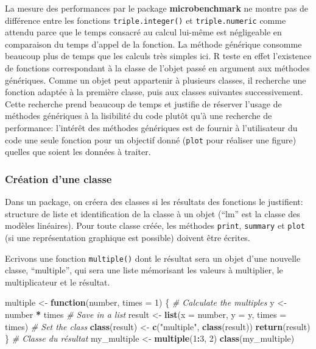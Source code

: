 \documentclass[
  12pt,
  french,
  a4paper,
  extrafontsizes,onecolumn,openright
  ]{memoir}
\newenvironment{Shaded}{\begin{snugshade}}{\end{snugshade}}
\newcommand{\AttributeTok}[1]{\textcolor[rgb]{0.13,0.29,0.53}{#1}}
\newcommand{\CommentTok}[1]{\textcolor[rgb]{0.56,0.35,0.01}{\textit{#1}}}
\newcommand{\ControlFlowTok}[1]{\textcolor[rgb]{0.13,0.29,0.53}{\textbf{#1}}}
\newcommand{\DecValTok}[1]{\textcolor[rgb]{0.00,0.00,0.81}{#1}}
\newcommand{\FunctionTok}[1]{\textcolor[rgb]{0.13,0.29,0.53}{\textbf{#1}}}
\newcommand{\NormalTok}[1]{#1}
\newcommand{\OtherTok}[1]{\textcolor[rgb]{0.56,0.35,0.01}{#1}}
\newcommand{\SpecialCharTok}[1]{\textcolor[rgb]{0.81,0.36,0.00}{\textbf{#1}}}
\newcommand{\StringTok}[1]{\textcolor[rgb]{0.31,0.60,0.02}{#1}}
\newlength{\rf}
\begin{document}
La mesure des performances par le package \textbf{microbenchmark} ne montre pas de différence entre les fonctions \texttt{triple.integer()} et \texttt{triple.numeric} comme attendu parce que le temps consacré au calcul lui-même est négligeable en comparaison du temps d'appel de la fonction.
La méthode générique consomme beaucoup plus de temps que les calculs très simples ici.
R teste en effet l'existence de fonctions correspondant à la classe de l'objet passé en argument aux méthodes génériques.
Comme un objet peut appartenir à plusieurs classes, il recherche une fonction adaptée à la première classe, puis aux classes suivantes successivement.
Cette recherche prend beaucoup de temps et justifie de réserver l'usage de méthodes génériques à la lisibilité du code plutôt qu'à une recherche de performance: l'intérêt des méthodes génériques est de fournir à l'utilisateur du code une seule fonction pour un objectif donné (\texttt{plot} pour réaliser une figure) quelles que soient les données à traiter.

\subsubsection{Création d'une classe}\label{cruxe9ation-dune-classe}

Dans un package, on créera des classes si les résultats des fonctions le justifient: structure de liste et identification de la classe à un objet (\enquote{lm} est la classe des modèles linéaires).
Pour toute classe créée, les méthodes \texttt{print}, \texttt{summary} et \texttt{plot} (si une représentation graphique est possible) doivent être écrites.

Ecrivons une fonction \texttt{multiple()} dont le résultat sera un objet d'une nouvelle classe, \enquote{multiple}, qui sera une liste mémorisant les valeurs à multiplier, le multiplicateur et le résultat.

\scriptsize

\begin{Shaded}
\begin{Highlighting}[]
\NormalTok{multiple }\OtherTok{\textless{}{-}} \ControlFlowTok{function}\NormalTok{(number, }\AttributeTok{times =} \DecValTok{1}\NormalTok{) \{}
  \CommentTok{\# Calculate the multiples}
\NormalTok{  y }\OtherTok{\textless{}{-}}\NormalTok{ number }\SpecialCharTok{*}\NormalTok{ times}
  \CommentTok{\# Save in a list}
\NormalTok{  result }\OtherTok{\textless{}{-}} \FunctionTok{list}\NormalTok{(}\AttributeTok{x =}\NormalTok{ number, }\AttributeTok{y =}\NormalTok{ y, }\AttributeTok{times =}\NormalTok{ times)}
  \CommentTok{\# Set the class}
  \FunctionTok{class}\NormalTok{(result) }\OtherTok{\textless{}{-}} \FunctionTok{c}\NormalTok{(}\StringTok{"multiple"}\NormalTok{, }\FunctionTok{class}\NormalTok{(result))}
  \FunctionTok{return}\NormalTok{(result)}
\NormalTok{\}}
\CommentTok{\# Classe du résultat}
\NormalTok{my\_multiple }\OtherTok{\textless{}{-}} \FunctionTok{multiple}\NormalTok{(}\DecValTok{1}\SpecialCharTok{:}\DecValTok{3}\NormalTok{, }\DecValTok{2}\NormalTok{)}
\FunctionTok{class}\NormalTok{(my\_multiple)}
\end{Highlighting}
\end{Shaded}
\end{document}
